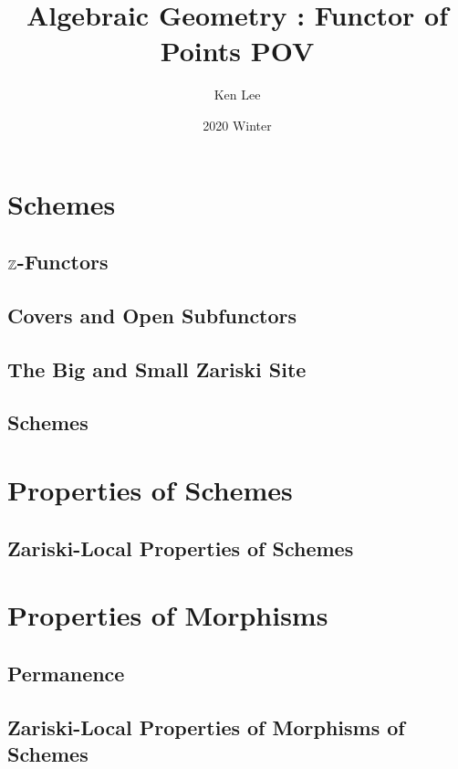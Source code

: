 \documentclass{article}
\begin{document}
\title{Algebraic Geometry : Functor of Points POV}

\author{Ken Lee}
\date{2020 Winter}
\maketitle

\tableofcontents



\newpage
\section{Schemes}
\subsection{$\mathbb{Z}$-Functors}
\subsection{Covers and Open Subfunctors}
\subsection{The Big and Small Zariski Site}
\subsection{Schemes}
\newpage
\section{Properties of Schemes}
\subsection{Zariski-Local Properties of Schemes}
  
\newpage
\section{Properties of Morphisms}
\subsection{Permanence}
\subsection{Zariski-Local Properties of Morphisms of Schemes}
  
\end{document}
